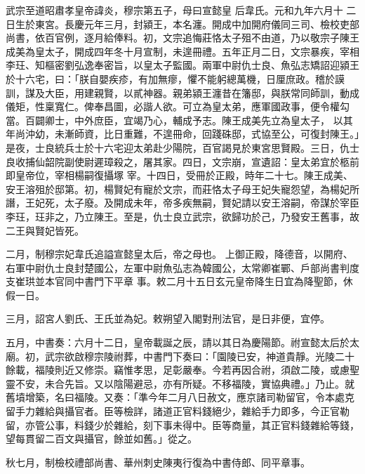 
\begin{pinyinscope}

 武宗至道昭肅孝皇帝諱炎，穆宗第五子，母曰宣懿皇
 后韋氏。元和九年六月十
 二日生於東宮。長慶元年三月，封潁王，本名瀍。開成中加開府儀同三司、檢校吏部尚書，依百官例，逐月給俸料。初，文宗追悔莊恪太子殂不由道，乃以敬宗子陳王成美為皇太子，開成四年冬十月宣制，未遑冊禮。五年正月二日，文宗暴疾，宰相李玨、知樞密劉弘逸奉密旨，以皇太子監國。兩軍中尉仇士良、魚弘志矯詔迎潁王於十六宅，曰：「朕自嬰疾疹，有加無瘳，懼不能躬總萬機，日厘庶政。稽於謨訓，謀及大臣，用建親賢，以貳神器。親弟潁王瀍昔在籓邸，與朕常同師訓，動成儀矩，性稟寬仁。俾奉昌圖，必諧人欲。可立為皇太弟，應軍國政事，便令權勾當。百闢卿士，中外庶臣，宜竭乃心，輔成予志。陳王成美先立為皇太子，
 以其年尚沖幼，未漸師資，比日重難，不遑冊命，回踐硃邸，式協至公，可復封陳王。」是夜，士良統兵士於十六宅迎太弟赴少陽院，百官謁見於東宮思賢殿。三日，仇士良收捕仙韶院副使尉遲璋殺之，屠其家。四日，文宗崩，宣遺詔：皇太弟宜於柩前即皇帝位，宰相楊嗣復攝塚
 宰。十四日，受冊於正殿，時年二十七。陳王成美、安王溶殂於邸第。初，楊賢妃有寵於文宗，而莊恪太子母王妃失寵怨望，為楊妃所譖，王妃死，太子廢。及開成未年，帝多疾無嗣，賢妃請以安王溶嗣，帝謀於宰臣李玨，玨非之，乃立陳王。至是，仇士良立武宗，欲歸功於己，乃發安王舊事，故二王與賢妃皆死。



 二月，制穆宗妃韋氏追謚宣懿皇太后，帝之母也。
 上御正殿，降德音，以開府、右軍中尉仇士良封楚國公，左軍中尉魚弘志為韓國公，太常卿崔鄲、戶部尚書判度支崔珙並本官同中書門下平章
 事。敕二月十五日玄元皇帝降生日宜為降聖節，休假一日。



 三月，詔宮人劉氏、王氏並為妃。敕朔望入閣對刑法官，是日非便，宜停。



 五月，中書奏：六月十二日，皇帝載誕之辰，請以其日為慶陽節。祔宣懿太后於太廟。初，武宗欲啟穆宗陵祔葬，中書門下奏曰：「園陵已安，神道貴靜。光陵二十餘載，福陵則近又修崇。竊惟孝思，足彰嚴奉。今若再因合祔，須啟二陵，或慮聖靈不安，未合先旨。又以陰陽避忌，亦有所疑。不移福陵，實協典禮。」乃止。就
 舊墳增築，名曰福陵。又奏：「準今年二月八日赦文，應京諸司勒留官，令本處克留手力雜給與攝官者。臣等檢詳，諸道正官料錢絕少，雜給手力即多，今正官勒留，亦管公事，料錢少於雜給，刻下事未得中。臣等商量，其正官料錢雜給等錢，望每貫留二百文與攝官，餘並如舊。」從之。



 秋七月，制檢校禮部尚書、華州刺史陳夷行復為中書侍郎、同平章事。




\end{pinyinscope}
